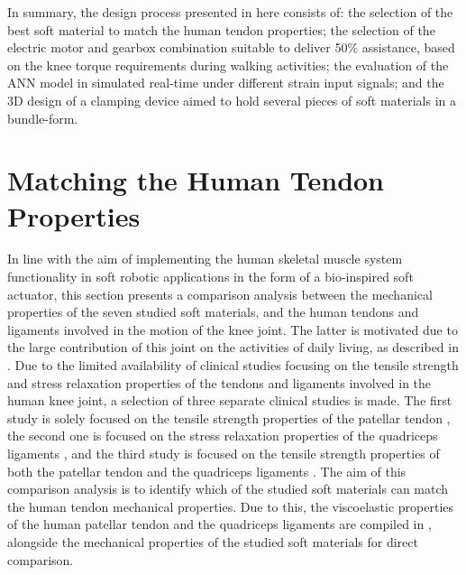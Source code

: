 In summary, the design process presented in here consists of: the selection of the best soft material to match the human tendon properties; the selection of the electric motor and gearbox combination suitable to deliver 50\% assistance, based on the knee torque requirements during walking activities; the evaluation of the ANN model in simulated real-time under different strain input signals; and the 3D design of a clamping device aimed to hold several pieces of soft materials in a bundle-form.

\section{Matching the Human Tendon Properties}

In line with the aim of implementing the human skeletal muscle system functionality in soft robotic applications in the form of a bio-inspired soft actuator, this section presents a comparison analysis between the mechanical properties of the seven studied soft materials, and the human tendons and ligaments involved in the motion of the knee joint. The latter is motivated due to the large contribution of this joint on the activities of daily living, as described in . Due to the limited availability of clinical studies focusing on the tensile strength and stress relaxation properties of the tendons and ligaments involved in the human knee joint, a selection of three separate clinical studies is made. The first study is solely focused on the tensile strength properties of the patellar tendon \cite{johnson1994tensile}, the second one is focused on the stress relaxation properties of the quadriceps ligaments \cite{schatzmann1998effect}, and the third study is focused on the tensile strength properties of both the patellar tendon and the quadriceps ligaments \cite{staubli1999mechanical}. The aim of this comparison analysis is to identify which of the studied soft materials can match the human tendon mechanical properties. Due to this, the viscoelastic properties of the human patellar tendon and the quadriceps ligaments are compiled in , alongside the mechanical properties of the studied soft materials for direct comparison.

